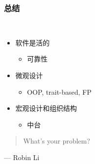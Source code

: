 \documentclass[UTF8,lualatex]{ctexbeamer}
\newcommand{\pagequote}[2]{
  \Large
  \begin{quotation}
      #1
  \end{quotation}
  \flushright\normalsize --- {#2}
}
\begin{document}
\begin{frame}
    \frametitle{总结}
    \begin{block}{~}
        \begin{itemize}
            \item 软件是活的
                \begin{itemize}
                    \item 可靠性
                \end{itemize}
            \item 微观设计
                \begin{itemize}
                    \item OOP, trait-based, FP
                \end{itemize}
            \item 宏观设计和组织结构
                \begin{itemize}
                    \item 中台
                \end{itemize}
        \end{itemize}
    \end{block}
\end{frame}

\begin{frame}
    \pagequote{What's your problem?}{Robin Li}
\end{frame}
\end{document}

